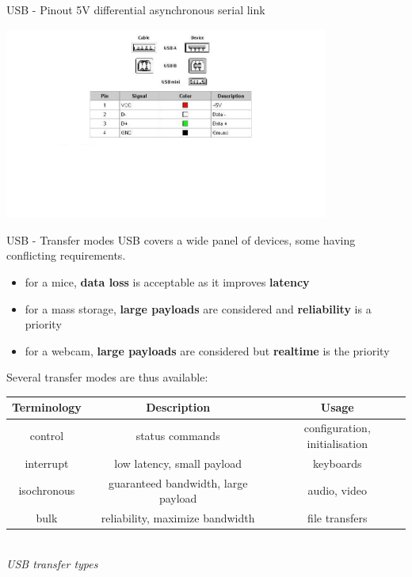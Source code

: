 \begin{frame}{USB - Pinout}
  5V differential asynchronous serial link
  \smallskip
  \begin{center}
    \includegraphics[width=0.8\textwidth]{figures/usb_pinout.jpg}
  \end{center}
\end{frame}

\begin{frame}{USB - Transfer modes}
  USB covers a wide panel of devices, some having conflicting requirements.
  \begin{itemize}
  \item for a mice, \textbf{data loss} is acceptable as it improves \textbf{latency}
  \item for a mass storage, \textbf{large payloads} are considered and \textbf{reliability} is a priority
  \item for a webcam, \textbf{large payloads} are considered but \textbf{realtime} is the priority
  \end{itemize}

  \smallskip
  Several transfer modes are thus available:
  \smallskip
  \begin{center}
    \begin{tabular}{|c|c|c|}
      \hline
      \textbf{Terminology} & \textbf{Description} & \textbf{Usage} \\
      \hline
      control & status commands & configuration, initialisation \\
      \hline
      interrupt & low latency, small payload & keyboards \\
      \hline
      isochronous & guaranteed bandwidth, large payload & audio, video \\
      \hline
      bulk & reliability, maximize bandwidth & file transfers \\
      \hline
    \end{tabular}
    \smallskip
    \begin{tiny}
      \textit{\\USB transfer types}
    \end{tiny}
  \end{center}
\end{frame}

